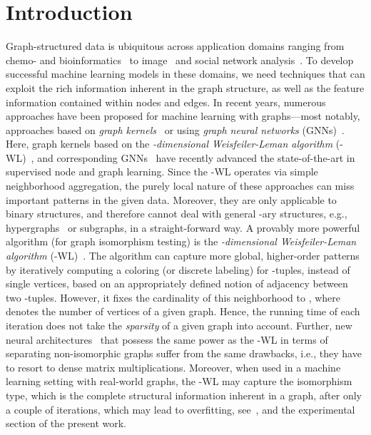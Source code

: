 \documentclass{article}
\theoremstyle{definition}
\newcommand{\new}[1]{\emph{#1}}
\newcommand{\wl}{-\textsf{WL}\xspace}
\newcommand{\kwl}{-\textsf{WL}\xspace}
\begin{document}
\section{Introduction}
Graph-structured data is ubiquitous across application domains ranging from chemo- and bioinformatics~\cite{Barabasi2004,Sto+2020} to image~\cite{Sim+2017} and social network analysis~\cite{Eas+2010}. To develop successful machine learning models in these domains, we need techniques that can exploit the rich information inherent in the graph structure, as well as the feature information contained within nodes and edges. In recent years, numerous approaches have been proposed for machine learning with graphs---most notably, approaches based on \new{graph kernels}~\cite{Kri+2019} or using \new{graph neural networks} (GNNs)~\cite{Cha+2020,Gil+2017,Gro+2020}. Here, graph kernels based on the \new{-dimensional Weisfeiler-Leman algorithm} (\wl)~\cite{Gro2017,Wei+1968}, and corresponding GNNs~\cite{Mor+2019,Xu+2018b} have recently advanced the state-of-the-art in supervised node and graph learning. Since the \wl operates via simple neighborhood aggregation, the purely local nature of these approaches can miss important patterns in the given data. Moreover, they are only applicable to binary structures, and therefore cannot deal with general -ary structures, e.g., hypergraphs~\cite{Zho+2006} or subgraphs, in a straight-forward way. A provably more powerful algorithm (for graph isomorphism testing) is the \emph{-dimensional Weisfeiler-Leman algorithm} (\kwl)~\cite{Cai+1992,Gro2017,Mar+2019}. The algorithm can capture more global, higher-order patterns by iteratively computing a coloring (or discrete labeling) for -tuples, instead of single vertices, based on an appropriately defined notion of adjacency between two -tuples. However, it fixes the cardinality of this neighborhood to , where  denotes the number of vertices of a given graph. Hence, the running time of each iteration does not take the \emph{sparsity} of a given graph into account. Further, new neural architectures~\cite{Mar+2019,Mar+2019b} that possess the same power as the \kwl in terms of separating non-isomorphic graphs suffer from the same drawbacks, i.e., they have to resort to dense matrix multiplications. Moreover, when used in a machine learning setting with real-world graphs, the \kwl may capture the isomorphism type, which is the complete structural information inherent in a graph, after only a couple of iterations, which may lead to overfitting, see~\cite{Mor+2017}, and the experimental section of the present work.
\end{document}
